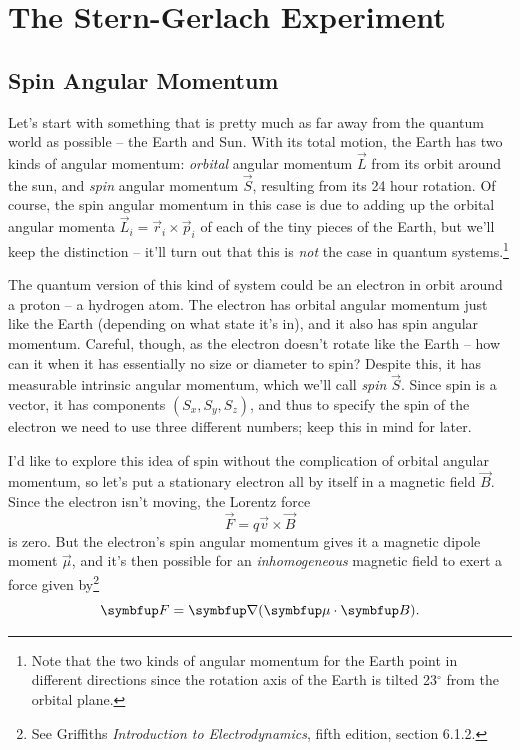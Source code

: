 \chapter{The Stern-Gerlach Experiment}

\section{Spin Angular Momentum}

Let's start with something that is pretty much as far away from the quantum world as possible -- the Earth and Sun.  With its total motion, the Earth has two kinds of angular momentum:  \emph{orbital} angular momentum $\vec{L}$ from its orbit around the sun, and \emph{spin} angular momentum $\vec{S}$, resulting from its 24 hour rotation.  Of course, the spin angular momentum in this case is due to adding up the orbital angular momenta $\vec{L}_i = \vec{r}_i \times \vec{p}_i$ of each of the tiny pieces of the Earth, but we'll keep the distinction -- it'll turn out that this is \emph{not} the case in quantum systems.\footnote{Note that the two kinds of angular momentum for the Earth point in different directions since the rotation axis of the Earth is tilted 23$^\circ$ from the orbital plane.}

The quantum version of this kind of system could be an electron in orbit around a proton -- a hydrogen atom.  The electron has orbital angular momentum just like the Earth (depending on what state it's in), and it also has spin angular momentum.  Careful, though, as the electron doesn't rotate like the Earth -- how can it when it has essentially no size or diameter to spin?  Despite this, it has measurable intrinsic angular momentum, which we'll call \emph{spin} $\vec{S}$.  Since spin is a vector, it has components $(S_x, S_y, S_z)$, and thus to specify the spin of the electron we need to use three different numbers; keep this in mind for later.

I'd like to explore this idea of spin without the complication of orbital angular momentum, so let's put a stationary electron all by itself in a magnetic field $\vec{B}$.  Since the electron isn't moving, the Lorentz force
\[
\vec{F} = q\vec{v} \times \vec{B}
\]
is zero.  But the electron's spin angular momentum gives it a magnetic dipole moment $\vec{\mu}$, and it's then possible for an \emph{inhomogeneous} magnetic field to exert a force given by\footnote{See Griffiths \emph{Introduction to Electrodynamics}, fifth edition, section 6.1.2.}
\begin{equation}
\vec{F} = \grad (\vec{\mu} \cdot \vec{B}).
\label{eq_force_inhomo}
\end{equation}

